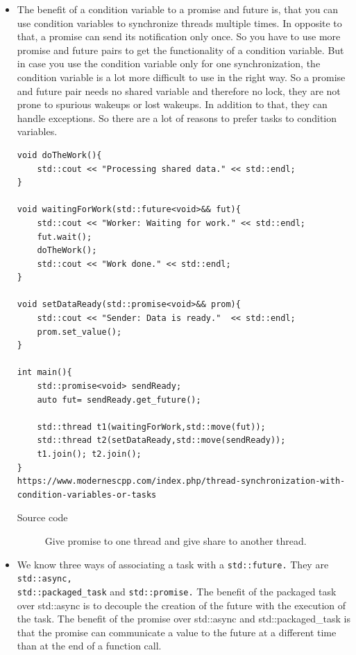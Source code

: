 \documentclass[a4paper,11pt,twoside]{book}
\begin{document}
\begin{itemize}
\item The benefit of a condition variable to a promise and future is, that you can use condition variables to synchronize threads multiple times. In opposite to that, a promise can send its notification only once. So you have to use more promise and future pairs to get the functionality of a condition variable. But in case you use the condition variable only for one synchronization, the condition variable is a lot more difficult to use in the right way. So a promise and future pair needs no shared variable and therefore no lock, they are not prone to spurious wakeups or lost wakeups. In addition to that, they can handle exceptions. So there are a lot of reasons to prefer tasks to condition variables.

\begin{lstlisting}[numbers=none]
void doTheWork(){
	std::cout << "Processing shared data." << std::endl;
}

void waitingForWork(std::future<void>&& fut){
	std::cout << "Worker: Waiting for work." << std::endl;
	fut.wait();
	doTheWork();
	std::cout << "Work done." << std::endl;
}

void setDataReady(std::promise<void>&& prom){
	std::cout << "Sender: Data is ready."  << std::endl;
	prom.set_value();	
}

int main(){
	std::promise<void> sendReady;
	auto fut= sendReady.get_future();
	
	std::thread t1(waitingForWork,std::move(fut));
	std::thread t2(setDataReady,std::move(sendReady));
	t1.join(); t2.join();
}
https://www.modernescpp.com/index.php/thread-synchronization-with-condition-variables-or-tasks
\end{lstlisting}
\begin{description}
		\item[Source code] Give promise to one thread and give share to another thread.
\end{description}

		\item We know three ways of associating a task with a \texttt{std::future.} They are \texttt{std::async,} \\ \texttt{std::packaged\_task} and \texttt{std::promise.} The benefit of the packaged task over std::async is to decouple the creation of the future with the execution of the task. The benefit of the promise over std::async and std::packaged\_task is that the promise can communicate a value to the future at a different time than at the end of a function call. 
\end{itemize}
\end{document}
